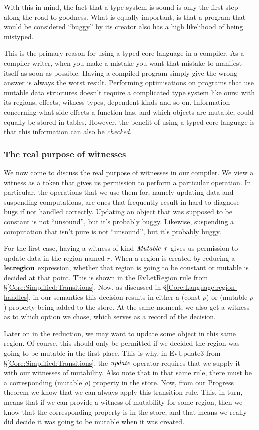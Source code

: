 With this in mind, the fact that a type system is sound is only the first step along the road to goodness. What is equally important, is that a program that would be considered ``buggy'' by its creator also has a high likelihood of being mistyped.

This is the primary reason for using a typed core language in a compiler. As a compiler writer, when you make a mistake you want that mistake to manifest itself as soon as possible. Having a compiled program simply give the wrong answer is always the worst result. Performing optimisations on programs that use mutable data structures doesn't require a complicated type system like ours: with its regions, effects, witness types, dependent kinds and so on. Information concerning what side effects a function has, and which objects are mutable, could equally be stored in tables. However, the benefit of using a typed core language is that this information can also be \emph{checked}.


\subsubsection{The real purpose of witnesses}
We now come to discuss the real purpose of witnesses in our compiler. We view a witness as a token that gives us permission to perform a particular operation. In particular, the operations that we use them for, namely updating data and suspending computations, are ones that frequently result in hard to diagnose bugs if not handled correctly. Updating an object that was supposed to be constant is not ``unsound'', but it's probably buggy. Likewise, suspending a computation that isn't pure is not ``unsound'', but it's probably buggy.

For the first case, having a witness of kind $\operatorname{\mathit{Mutable}} \ r$ gives us permission to update data in the region named $r$. When a region is created by reducing a $\textrm{\textbf{letregion}}$ expression, whether that region is going to be constant or mutable is decided at that point. This is shown in the EvLetRegion rule from \S\ref{Core:Simplified:Transitions}. Now, as discussed in \S\ref{Core:Language:region-handles}, in our semantics this decision results in either a (const $\rho$) or (mutable $\rho$) property being added to the store. At the same moment, we also get a witness as to which option we chose, which serves as a record of the decision.

Later on in the reduction, we may want to update some object in this same region. Of course, this should only be permitted if we decided the region was going to be mutable in the first place. This is why, in EvUpdate3 from  \S\ref{Core:Simplified:Transitions}, the $\operatorname{\mathit{update}}$ operator requires that we supply it with our witnesses of mutability. Also note that in that same rule, there must be a corresponding (mutable $\rho$) property in the store. Now, from our Progress theorem we know that we can always apply this transition rule. This, in turn, means that if we can provide a witness of mutability for some region, then we know that the corresponding property is in the store, and that means we really did decide it was going to be mutable when it was created.

